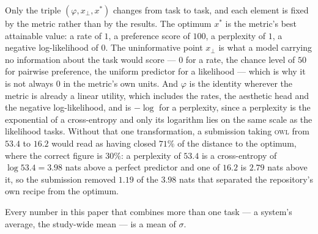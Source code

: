 Only the triple $(\varphi, x_{\perp}, x^{\ast})$ changes from task to task, and each element is fixed
by the metric rather than by the results. The optimum $x^{\ast}$ is the metric's best attainable
value: a rate of $1$, a preference score of $100$, a perplexity of $1$, a negative log-likelihood of
$0$. The uninformative point $x_{\perp}$ is what a model carrying no information about the task would
score --- $0$ for a rate, the chance level of $50$ for pairwise preference, the uniform predictor for
a likelihood --- which is why it is not always $0$ in the metric's own units. And $\varphi$ is the
identity wherever the metric is already a linear utility, which includes the rates, the aesthetic
head and the negative log-likelihood, and is $-\log$ for a perplexity, since a perplexity is the
exponential of a cross-entropy and only its logarithm lies on the same scale as the likelihood tasks.
Without that one transformation, a submission taking \textsc{owl} from $53.4$ to $16.2$ would read as
having closed $71\%$ of the distance to the optimum, where the correct figure is $30\%$: a perplexity
of $53.4$ is a cross-entropy of $\log 53.4 = 3.98$ nats above a perfect predictor and one of $16.2$ is
$2.79$ nats above it, so the submission removed $1.19$ of the $3.98$ nats that separated the
repository's own recipe from the optimum.

Every number in this paper that combines more than one task --- a system's average, the study-wide
mean --- is a mean of $\sigma$.
